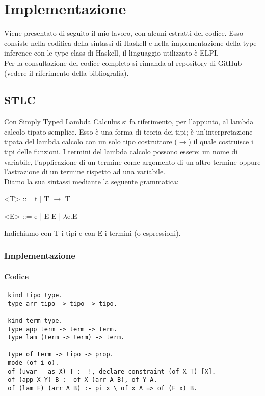 \documentclass[12pt,a4paper,openright,twoside]{report}
\begin{document}
\chapter{Implementazione}		%


Viene presentato di seguito il mio lavoro, con alcuni estratti del codice. Esso consiste nella codifica della sintassi di Haskell e nella implementazione della type inference con le type class di Haskell, il linguaggio utilizzato è ELPI.\\
Per la consultazione del codice completo si rimanda al repository di GitHub (vedere il riferimento \cite{K1} della bibliografia).

\section{STLC}

Con Simply Typed Lambda Calculus si fa riferimento, per l'appunto, al lambda calcolo tipato semplice. Esso è una forma di teoria dei tipi; è un'interpretazione tipata del lambda calcolo con un solo tipo costruttore ($\rightarrow$) il quale costruisce i tipi delle funzioni. I termini del lambda calcolo possono essere: un nome di variabile, l'applicazione di un termine come argomento di un altro termine oppure l'astrazione di un termine rispetto ad una variabile.\\
Diamo la sua sintassi mediante la seguente grammatica:
\begin{grammar}\centering
 \let\syntleft\relax    %
 \let\syntright\relax   %
 <T> ::= t | T $\rightarrow$ T
 
 <E> ::= e | E E | $\lambda$e.E
\end{grammar}
Indichiamo con T i tipi e con E i termini (o espressioni).

\subsection{Implementazione}

\subsubsection{Codice}
\begin{verbatim}
 kind tipo type.
 type arr tipo -> tipo -> tipo.

 kind term type.
 type app term -> term -> term.
 type lam (term -> term) -> term.

 type of term -> tipo -> prop.
 mode (of i o).
 of (uvar _ as X) T :- !, declare_constraint (of X T) [X].
 of (app X Y) B :- of X (arr A B), of Y A.
 of (lam F) (arr A B) :- pi x \ of x A => of (F x) B.
\end{verbatim}
\end{document}
